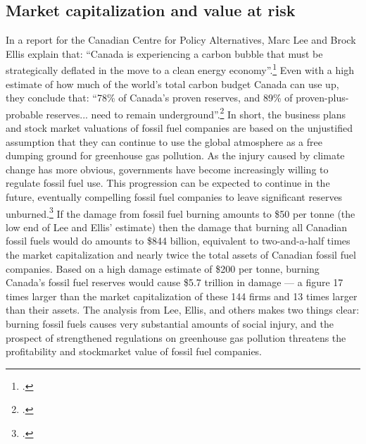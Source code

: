 	\subsection {Market capitalization and value at risk}



In a report for the Canadian Centre for Policy Alternatives, Marc Lee and Brock Ellis explain that: ``Canada is experiencing a carbon bubble that must be strategically deflated in the move to a clean energy economy''.\footcite[][p.5]{CanadaCarbonLiabilities}
Even with a high estimate of how much of the world's total carbon budget Canada can use up, they conclude that: ``78\% of Canada’s proven reserves, and 89\% of proven-plus- probable reserves... need to remain underground''.\footcite[][p.6]{CanadaCarbonLiabilities}
In short, the business plans and stock market valuations of fossil fuel companies are based on the unjustified assumption that they can continue to use the global atmosphere as a free dumping ground for greenhouse gas pollution.
As the injury caused by climate change has more obvious, governments have become increasingly willing to regulate fossil fuel use.
This progression can be expected to continue in the future, eventually compelling fossil fuel companies to leave significant reserves unburned.\footcite[See, for instance: ][]{ThreatenGrowth}
If the damage from fossil fuel burning amounts to \$50 per tonne (the low end of Lee and Ellis' estimate) then the damage that burning all Canadian fossil fuels would do amounts to \$844 billion, equivalent to two-and-a-half times the market capitalization and nearly twice the total assets of Canadian fossil fuel companies.
Based on a high damage estimate of \$200 per tonne, burning Canada's fossil fuel reserves would cause \$5.7 trillion in damage --- a figure 17 times larger than the market capitalization of these 144 firms and 13 times larger than their assets.
The analysis from Lee, Ellis, and others makes two things clear: burning fossil fuels causes very substantial amounts of social injury, and the prospect of strengthened regulations on greenhouse gas pollution threatens the profitability and stockmarket value of fossil fuel companies.



